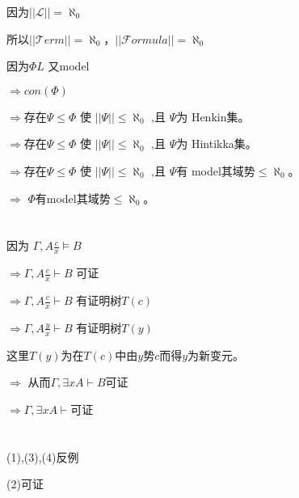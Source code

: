 \documentclass{article}
\begin{document}
\begin{CJK*}{UTF8}{gbsn}
因为$||\mathcal{L}|| = \aleph_0$

所以$||\mathcal{T}erm|| = \aleph_0$，$||\mathcal{F}ormula|| = \aleph_0$

因为$\Phi{L}$ 又model

$\Rightarrow con(\Phi)$

$\Rightarrow$存在$\Psi \leq \Phi$ 使 $||\Psi|| \leq \aleph_0$ ,且 $\Psi$为 Henkin集。

$\Rightarrow$存在$\Psi \leq \Phi$ 使 $||\Psi|| \leq \aleph_0$ ,且 $\Psi$为 Hintikka集。

$\Rightarrow$存在$\Psi \leq \Phi$ 使 $||\Psi|| \leq \aleph_0$ ,且 $\Psi$有 model其域势$\leq \aleph_0$。

$\Rightarrow$ $\Phi$有model其域势$\leq \aleph_0$。

\section{}
因为 $\Gamma , A\frac{c}{x} \vDash B$

 $\Rightarrow \Gamma , A\frac{c}{x} \vdash B$ 可证

$\Rightarrow \Gamma , A\frac{c}{x} \vdash B$ 有证明树$T(c)$

$\Rightarrow \Gamma , A\frac{y}{x} \vdash B$ 有证明树$T(y)$

这里$T(y)$为在$T(c)$中由$y$势$c$而得$y$为新变元。

$\Rightarrow$ 从而$\Gamma , \exists xA\vdash B$可证

$\Rightarrow \Gamma  , \exists xA\vdash$可证

\section{}

(1),(3),(4)反例

(2)可证

\end{CJK*}

\vspace{0.5cm} %

\noindent

\vspace{0.5cm}

\noindent
\begin{CJK*}{UTF8}{bsmi}
\end{CJK*}
\end{document}
